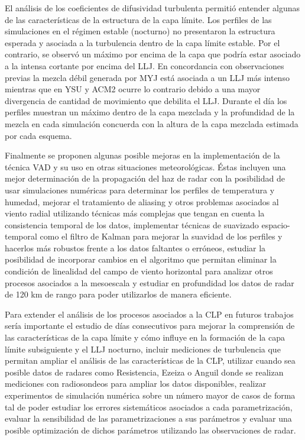\documentclass[12pt,spanish,oneside, a4paper]{book}
\begin{document}
El análisis de los coeficientes de difusividad turbulenta permitió
entender algunas de las características de la estructura de la capa
límite. Los perfiles de las simulaciones en el régimen estable
(nocturno) no presentaron la estructura esperada y asociada a la
turbulencia dentro de la capa límite estable. Por el contrario, se
observó un máximo por encima de la capa que podría estar asociado a la
intensa cortante por encima del LLJ. En concordancia con observaciones
previas la mezcla débil generada por MYJ está asociada a un LLJ más
intenso mientras que en YSU y ACM2 ocurre lo contrario debido a una
mayor divergencia de cantidad de movimiento que debilita el LLJ. Durante
el día los perfiles muestran un máximo dentro de la capa mezclada y la
profundidad de la mezcla en cada simulación concuerda con la altura de
la capa mezclada estimada por cada esquema.

Finalmente se proponen algunas posible mejoras en la implementación de
la técnica VAD y su uso en otras situaciones meteorológicas. Éstas
incluyen una mejor determinación de la propagación del haz de radar con
la posibilidad de usar simulaciones numéricas para determinar los
perfiles de temperatura y humedad, mejorar el tratamiento de aliasing y
otros problemas asociados al viento radial utilizando técnicas más
complejas que tengan en cuenta la consistencia temporal de los datos,
implementar técnicas de suavizado espacio-temporal como el filtro de
Kalman para mejorar la suavidad de los perfiles y hacerlos más robustos
frente a los datos faltantes o erróneos, estudiar la posibilidad de
incorporar cambios en el algoritmo que permitan eliminar la condición de
linealidad del campo de viento horizontal para analizar otros procesos
asociados a la mesoescala y estudiar en profundidad los datos de radar
de 120 km de rango para poder utilizarlos de manera eficiente.

Para extender el análisis de los procesos asociados a la CLP en futuros
trabajos sería importante el estudio de días consecutivos para mejorar
la comprensión de las características de la capa límite y cómo influye
en la formación de la capa límite subsiguiente y el LLJ nocturno,
incluir mediciones de turbulencia que permitan ampliar el análisis de
las características de la CLP, utilizar cuando sea posible datos de
radares como Resistencia, Ezeiza o Anguil donde se realizan mediciones
con radiosondeos para ampliar los datos disponibles, realizar
experimentos de simulación numérica sobre un número mayor de casos de
forma tal de poder estudiar los errores sistemáticos asociados a cada
parametrización, evaluar la sensibilidad de las parametrizaciones a sus
parámetros y evaluar una posible optimización de dichos parámetros
utilizando las observaciones de radar.
\end{document}
